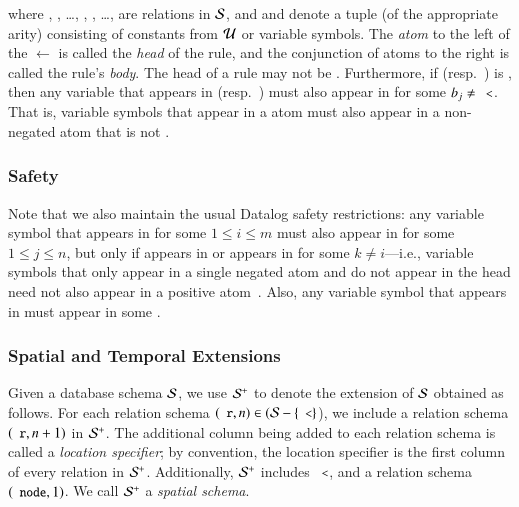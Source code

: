 where , , \ldots, ,
, \ldots,  are relations in $\schema$, and
 and  denote a tuple (of the appropriate arity)
consisting of constants from $\univ$ or variable symbols.  The {\em atom} to the
left of the $\leftarrow$ is called the {\em head} of the rule, and the
conjunction of atoms to the right is called the rule's {\em body}.
 The
head of a rule  may not be \dedalus{<}. Furthermore, if
 (resp.\ ) is \dedalus{<}, then any variable
that appears in  (resp.\ ) must
also appear in  for some $b_j \neq \dedalus{<}$. That is,
variable symbols that appear in a \dedalus{<} atom must also appear in a
non-negated atom that is not \dedalus{<}.

\subsubsection{Safety}
Note that we also maintain the usual Datalog safety restrictions: any variable
symbol  that appears in  for some $1 \leq i \leq m$ must
also appear in  for some $1 \leq j \leq n$, but only if 
appears in  or  appears in  for some $k \neq
i$---i.e., variable symbols that only appear in a single negated atom and do not
appear in the head need not also appear in a positive atom~\cite{ullmanbook}.
Also, any variable symbol that appears in  must appear in some
.

\subsubsection{Spatial and Temporal Extensions}

Given a database schema $\schema$, we use $\sschema$ to denote the extension of $\schema$
obtained as follows. For each relation schema $(\dedalus{r}, n) \in (\schema-\{\dedalus{<}\}$), we include a relation schema $(\dedalus{r}, n+1)$ in $\sschema$. The
additional column being added to each relation schema is called a {\em location specifier}; by convention, the
location specifier is the first column of every relation in $\sschema$.
Additionally, $\sschema$ includes $\dedalus{<}$, and a relation schema $(\dedalus{node},1)$.
We call $\sschema$ a {\em spatial schema}.

